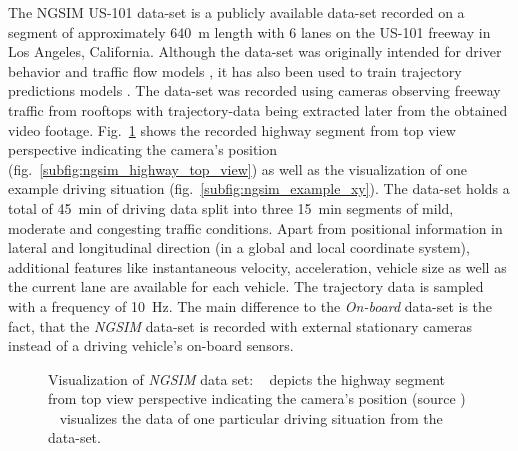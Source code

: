 The \ac{NGSIM} US-101 data-set \cite{NGSIM-US101} is a publicly available data-set recorded on a segment of approximately \SI{640}{\meter} length with \num{6} lanes on the US-101 freeway in Los Angeles, California.
Although the data-set was originally intended for driver behavior and traffic flow models \cite{He2017}, it has also been used to train trajectory predictions models \cite{Altche2018, Deo2018}.
The data-set was recorded using cameras observing freeway traffic from rooftops with trajectory-data being extracted later from the obtained video footage.
Fig.~\ref{fig:ngsim_dataset} shows the recorded highway segment from top view perspective indicating the camera's position (fig.~\ref{subfig:ngsim_highway_top_view}) as well as the visualization of one example driving situation (fig.~\ref{subfig:ngsim_example_xy}).
The data-set holds a total of \SI{45}{\minute} of driving data split into three \SI{15}{\minute} segments of mild, moderate and congesting traffic conditions.
Apart from positional information in lateral and longitudinal direction (in a global and local coordinate system), additional features like instantaneous velocity, acceleration, vehicle size as well as the current lane are available for each vehicle.
The trajectory data is sampled with a frequency of \SI{10}{\hertz}.
The main difference to the \emph{On-board} data-set is the fact, that the \emph{\ac{NGSIM}} data-set is recorded with external stationary cameras instead of a driving vehicle's on-board sensors.
\begin{figure}[t!]
	\centering
    \caption{Visualization of \emph{\ac{NGSIM}} data set: ~\protect{} depicts the highway segment from top view perspective indicating the camera's position (source \cite{NGSIM-US101}) ~\protect{} visualizes the data of one particular driving situation from the data-set.}\label{fig:ngsim_dataset}
\end{figure}
